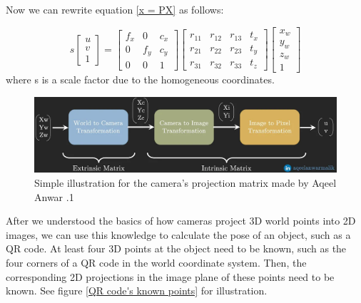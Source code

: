 Now we can rewrite equation \ref{x = PX} as follows:

\begin{equation}
	s
	\begin{bmatrix}
		u\\v\\1
	\end{bmatrix}
	=
	\begin{bmatrix}
		f_x & 0 & c_x\\
		0 & f_y & c_y\\
		0 & 0 & 1
	\end{bmatrix}
	\begin{bmatrix}
		r_{11} & r_{12} & r_{13} & t_{x}\\
		r_{21} & r_{22} & r_{23} & t_{y}\\
		r_{31} & r_{32} & r_{33} & t_{z}
	\end{bmatrix}
	\begin{bmatrix}
		x_w\\y_w\\z_w\\1
	\end{bmatrix}
	\label{expanded form of x = PX}
\end{equation}
where s is a scale factor due to the homogeneous coordinates.

\begin{figure}[h] %
	\centering
	\includegraphics[width=\textwidth]{assets/ch3/Aqeel Anwar's camera's projection pipeline.png}
	\caption{Simple illustration for the camera's projection matrix made by Aqeel Anwar \cite{Aqeel Anwar}.1}
\end{figure}

After we understood the basics of how cameras project 3D world points into 2D images, we can use this knowledge to calculate the pose of an object, such as a QR code. At least four 3D points at the object need to be known, such as the four corners of a QR code in the world coordinate system. Then, the corresponding 2D projections in the image plane of these points need to be known. See figure \ref{QR code's known points} for illustration.


